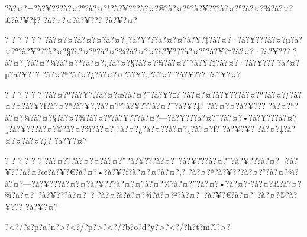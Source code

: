 \documentclass[11pt, openany]{book}
\begin{document}
{{{{{{{{{{{{{{{{{?à?¤?¬?à?¥???à?¤?°?à?¤?¹?à?¥???à?¤?®?à?¤?ª?à?¥???à?¤?°?à?¤?¾?à?¤?£?à?¥?‡?
?à?¤?¤?à?¥??? ?à?¥?¤?

? ? ? ? ? ?
?à?¤?¤?à?¤?¤?à?¤?¸?à?¥???à?¤?¤?à?¥?‡?à?¤?·?à?¥???à?¤?µ?à?¤?°?à?¥???à?¤?§?à?¤?ª?à?¤?¾?à?¤?¤?à?¥???à?¤?°?à?¥?‡?à?¤?·?à?¥???
?à?¤?¸?à?¤?¾?à?¤?ª?à?¤?¿?à?¤?§?à?¤?¾?à?¤?¨?à?¥?‡?à?¤?·?à?¥???
?à?¤?µ?à?¥?ˆ? ?à?¤?ª?à?¤?¿?à?¤?¤?à?¥?„?à?¤?¨?à?¥??? ?à?¥?¤?

? ? ? ? ? ? ?à?¤?ª?à?¥?‚?à?¤?œ?à?¤?¯?à?¥?‡?
?à?¤?¤?à?¥???à?¤?ª?à?¤?¿?à?¤?¤?à?¥?ƒ?à?¤?ª?à?¥?‚?à?¤?°?à?¥???à?¤?¯?à?¥?‡?
?à?¤?¤?à?¥???
?à?¤?ª?à?¤?¾?à?¤?§?à?¤?¾?à?¤?°?à?¥???à?¤?---?à?¥???à?¤?¯?à?¤?•?à?¥???à?¤?¸?à?¥???à?¤?®?à?¤?¾?à?¤?¦?à?¤?¿?à?¤?­?à?¤?¿?à?¤?ƒ?
?à?¥?¥? ?à?¤?‡?à?¤?¤?à?¤?¿? ?à?¥?¤?

? ? ? ? ? ?
?à?¤???à?¤?¤?à?¤?¨?à?¥???à?¤?¨?à?¥???à?¤?¯?à?¥???à?¤?¬?à?¥???à?¤?œ?à?¥?€?à?¤?•?à?¥?ƒ?à?¤?¤?à?¤?‚?
?à?¤?ª?à?¥???à?¤?°?à?¤?¾?à?¤?---?à?¥???à?¤?¤?à?¥???à?¤?¤?à?¤?¾?à?¤?¨?à?¤?•?à?¤?°?à?¤?£?à?¤?¾?à?¤?¨?à?¥???à?¤?¨?
?à?¤?š?à?¤?¾?à?¤?²?à?¤?¨?à?¥?€?à?¤?¯?à?¤?®?à?¥??? ?à?¥?¤?

?\textless{}?/?s?p?a?n?\textgreater{}?\textless{}?/?p?\textgreater{}?\textless{}?/?b?o?d?y?\textgreater{}?\textless{}?/?h?t?m?l?\textgreater{}?

}}}}}}}}}}}}}}}}}
\end{document}
